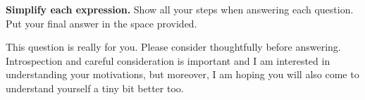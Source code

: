 \documentclass[addpoints, 12pt] {exam}
\begin{document}
\begin{questions}
\newpage
\question \textbf{Simplify each expression.} Show all your steps when answering each question. Put your final answer in the space provided.
\newpage
\question This question is really for you. Please consider thoughtfully before answering. Introspection and careful consideration is important and I am interested in understanding your motivations, but moreover, I am hoping you will also come to understand yourself a tiny bit better too.
\end{questions}
\end{document}

